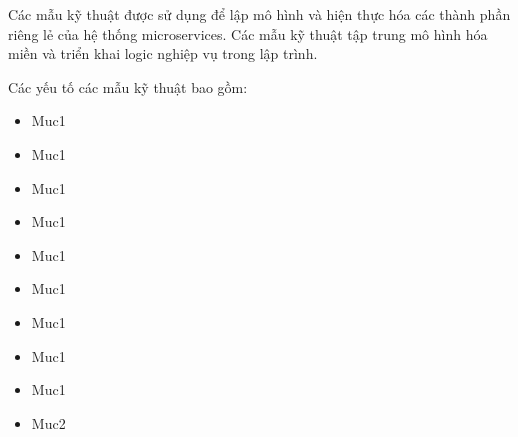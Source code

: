 Các mẫu     kỹ thuật được sử dụng để lập mô hình và hiện thực hóa  các thành phần riêng lẻ của hệ thống microservices.  Các mẫu     kỹ thuật  tập trung    mô hình hóa miền và triển khai logic nghiệp vụ trong lập trình.




 

Các yếu tố  các mẫu     kỹ thuật  bao gồm:





\begin{itemize}
\item Muc1  
\item Muc1  
\item Muc1  
\item Muc1  
\item Muc1  
\item Muc1  
\item Muc1  
\item Muc1  
\item Muc1  
\item Muc2  
\end{itemize}






  













